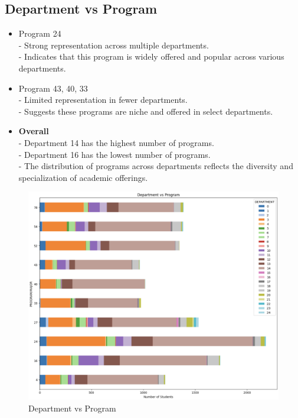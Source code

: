 \documentclass[12pt]{article}
\begin{document}
\subsection{Department vs Program}

\begin{itemize}
    \item Program 24\\
    - Strong representation across multiple departments.\\
    - Indicates that this program is widely offered and popular across various departments.

    \item Program 43, 40, 33\\
    - Limited representation in fewer departments.\\
    - Suggests these programs are niche and offered in select departments.
    
    \item \textbf{Overall}\\
    - Department 14 has the highest number of programs.\\
    - Department 16 has the lowest number of programs.\\
    - The distribution of programs across departments reflects the diversity and specialization of academic offerings.
\end{itemize}

\begin{figure}[H]
    \centering
    \includegraphics[width=1\linewidth]{department_vs_program.png}
    \caption{Department vs Program}
\end{figure}
\end{document}
